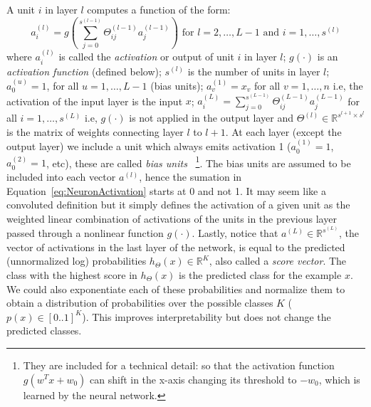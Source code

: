 A unit $i$ in layer $l$ computes a function of the form:
\begin{equation}
	a^{(l)}_i = g \left(\sum_{j=0}^{s^{(l-1)}} \Theta^{(l-1)}_{ij}a_j^{(l-1)}\right) \text{ for $l= 2,\dots,L-1$ and $i = 1,\dots,s^{(l)}$}
	\label{eq:NeuronActivation}
\end{equation}
where $a^{(l)}_i$ is called the \emph{activation} or output of unit $i$ in layer $l$;
$g(\cdot)$ is an \emph{activation function} (defined below);
$s^{(l)}$ is the number of units in layer $l$;
$a^{(u)}_0 = 1$, for all $u = 1, \ldots, L-1$ (bias units);
$a^{(1)}_v = x_v$ for all $v = 1, \ldots, n$ i.e, the activation of the input layer is the input $x$;
$a^{(L)}_i = \sum_{j=0}^{s^{(L-1)}} \Theta^{(L-1)}_{ij}a_j^{(L-1)}$ for all $i = 1,\dots,s^{(L)}$ i.e, $g(\cdot)$ is not applied in the output layer
and $\Theta^{(l)} \in \mathbb{R}^{s^{l+1} \times s^{l}} $ is the matrix of weights connecting layer $l$ to $l+1$. At each layer (except the output layer) we include a unit which always emits activation 1 ($a^{(1)}_0 = 1$, $a^{(2)}_0 = 1$, etc), these are called \emph{bias units}~
\footnote{They are included for a technical detail: so that the activation function $g(w^Tx+w_0)$ can shift in the x-axis changing its threshold to $-w_0$, which is learned by the neural network.}. 
The bias units are assumed to be included into each vector $a^{(l)}$, hence the sumation in Equation~\ref{eq:NeuronActivation} starts at 0 and not 1. It may seem like a convoluted definition but it simply defines the activation of a given unit as the weighted linear combination of activations of the units in the previous layer passed through a nonlinear function $g(\cdot)$.
Lastly, notice that $a^{(L)} \in \mathbb{R}^{s^{(L)}}$, the vector of activations in the last layer of the network, is equal to the predicted (unnormalized log) probabilities $h_\Theta(x) \in \mathbb{R}^K$, also called a \emph{score vector}. The class with the highest score in $h_\Theta(x)$ is the predicted class for the example $x$. We could also exponentiate each of these probabilities and normalize them to obtain a distribution of probabilities over the possible classes $K$ ($p(x) \in [0..1]^K$). This improves interpretability but does not change the predicted classes.

